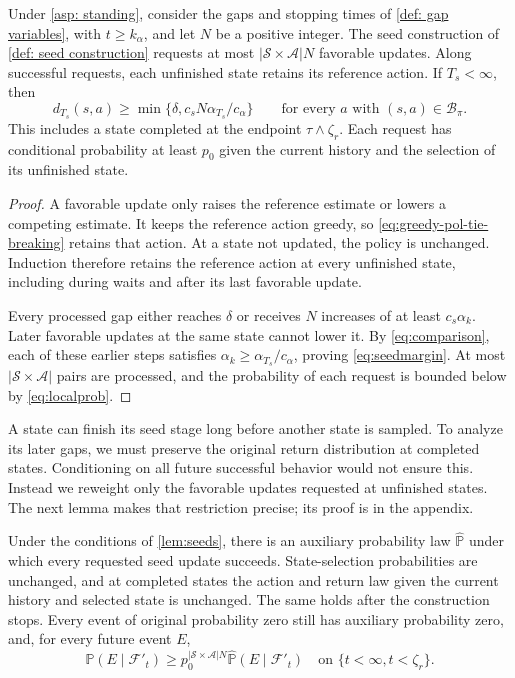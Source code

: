 \begin{lemma}[Seed]
\label{lem:seeds}
Under \autoref{asp: standing}, consider the gaps and stopping times of \autoref{def: gap variables}, with $t\ge k_\alpha$, and let $N$ be a positive integer. The seed construction of \autoref{def: seed construction} requests at most $|\mathcal S\times\mathcal A|N$ favorable updates. Along successful requests, each unfinished state retains its reference action. If $T_s<\infty$, then
\begin{equation}
\label{eq:seedmargin}
d_{T_s}(s,a)\ge\min\{\delta,c_sN\alpha_{T_s}/c_\alpha\}
\qquad\text{for every }a\text{ with }(s,a)\in\mathcal B_\pi.
\end{equation}
This includes a state completed at the endpoint $\tau\wedge\zeta_r$. Each request has conditional probability at least $p_0$ given the current history and the selection of its unfinished state.
\end{lemma}
\begin{proof}
A favorable update only raises the reference estimate or lowers a competing estimate. It keeps the reference action greedy, so \eqref{eq:greedy-pol-tie-breaking} retains that action. At a state not updated, the policy is unchanged. Induction therefore retains the reference action at every unfinished state, including during waits and after its last favorable update.

Every processed gap either reaches $\delta$ or receives $N$ increases of at least $c_s\alpha_k$. Later favorable updates at the same state cannot lower it. By \eqref{eq:comparison}, each of these earlier steps satisfies $\alpha_k\ge\alpha_{T_s}/c_\alpha$, proving \eqref{eq:seedmargin}.
At most $|\mathcal S\times\mathcal A|$ pairs are processed, and the probability of each request is bounded below by \eqref{eq:localprob}.
\end{proof}

A state can finish its seed stage long before another state is sampled. To analyze its later gaps, we must preserve the original return distribution at completed states. Conditioning on all future successful behavior would not ensure this. Instead we reweight only the favorable updates requested at unfinished states. The next lemma makes that restriction precise; its proof is in the appendix.

\begin{lemma}
\label{lem:measure}
Under the conditions of \autoref{lem:seeds}, there is an auxiliary probability law $\widehat{\mathbb P}$ under which every requested seed update succeeds. State-selection probabilities are unchanged, and at completed states the action and return law given the current history and selected state is unchanged. The same holds after the construction stops. Every event of original probability zero still has auxiliary probability zero, and, for every future event $E$,
\begin{equation}
\label{eq:transfer}
\mathbb P(E\mid\mathcal F'_t)
\ge p_0^{|\mathcal S\times\mathcal A|N}\widehat{\mathbb P}(E\mid\mathcal F'_t)
\quad\text{on }\{t<\infty,t<\zeta_r\}.
\end{equation}
\end{lemma}


